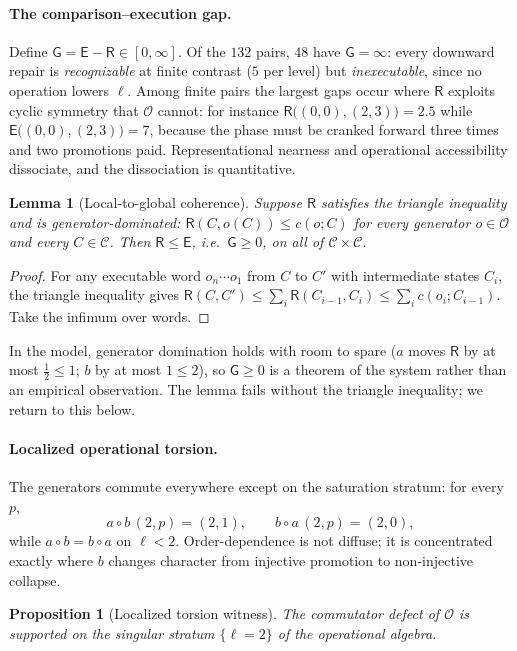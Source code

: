 \documentclass[11pt]{article}
\newtheorem{proposition}[theorem]{Proposition}
\newtheorem{lemma}[theorem]{Lemma}
\theoremstyle{remark}
\newcommand{\C}{\mathcal{C}}
\newcommand{\Ops}{\mathcal{O}}
\newcommand{\R}{\mathsf{R}}
\newcommand{\E}{\mathsf{E}}
\newcommand{\G}{\mathsf{G}}
\begin{document}
\paragraph{The comparison--execution gap.}
Define $\G = \E - \R \in [0,\infty]$. Of the $132$ pairs, $48$ have
$\G=\infty$: every downward repair is \emph{recognizable} at finite
contrast ($5$ per level) but \emph{inexecutable}, since no operation
lowers $\ell$. Among finite pairs the largest gaps occur where $\R$
exploits cyclic symmetry that $\Ops$ cannot: for instance
$\R\bigl((0,0),(2,3)\bigr)=2.5$ while $\E\bigl((0,0),(2,3)\bigr)=7$,
because the phase must be cranked forward three times and two
promotions paid. Representational nearness and operational
accessibility dissociate, and the dissociation is quantitative.

\begin{lemma}[Local-to-global coherence]\label{lem:coherence}
Suppose $\R$ satisfies the triangle inequality and is
\emph{generator-dominated}: $\R(C,o(C)) \le c(o;C)$ for every
generator $o\in\Ops$ and every $C\in\C$. Then $\R \le \E$, i.e.\
$\G\ge0$, on all of $\C\times\C$.
\end{lemma}

\begin{proof}
For any executable word $o_n\cdots o_1$ from $C$ to $C'$ with
intermediate states $C_i$, the triangle inequality gives
$\R(C,C') \le \sum_i \R(C_{i-1},C_i) \le \sum_i c(o_i;C_{i-1})$.
Take the infimum over words.
\end{proof}

In the model, generator domination holds with room to spare ($a$ moves
$\R$ by at most $\tfrac12 \le 1$; $b$ by at most $1 \le 2$), so
$\G\ge0$ is a theorem of the system rather than an empirical
observation. The lemma fails without the triangle inequality; we
return to this below.

\paragraph{Localized operational torsion.}
The generators commute everywhere except on the saturation stratum:
for every $p$,
\[
a\circ b\,(2,p) = (2,1), \qquad b\circ a\,(2,p) = (2,0),
\]
while $a\circ b = b\circ a$ on $\ell<2$. Order-dependence is not
diffuse; it is concentrated exactly where $b$ changes character from
injective promotion to non-injective collapse.

\begin{proposition}[Localized torsion witness]
The commutator defect of\/ $\Ops$ is supported on the singular stratum
$\{\ell=2\}$ of the operational algebra.
\end{proposition}
\end{document}
